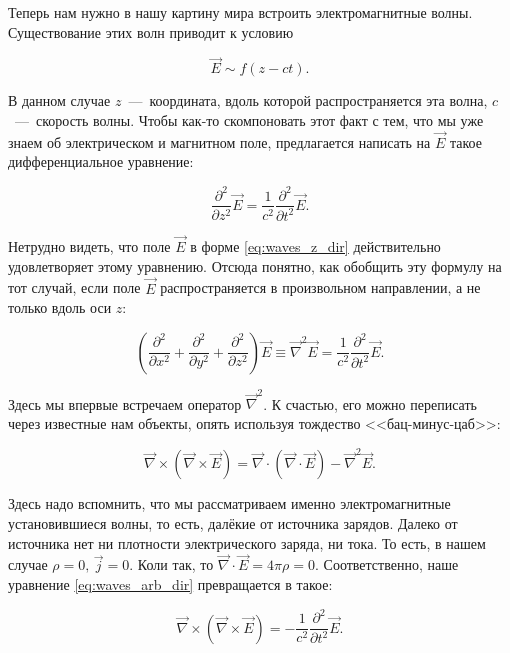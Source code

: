 \documentclass[a4paper,12pt]{article}
\newcommand{\pt}{\partial}
\newcommand{\vn}{\vec{\nabla}}
\begin{document}
Теперь нам нужно в нашу картину мира встроить электромагнитные
волны. Существование этих волн приводит к условию

\begin{equation}
  \label{eq:waves_z_dir}
  \vec{E} \sim f (z-ct).
\end{equation}

В данном случае $z$~---~координата, вдоль которой распространяется эта
волна, $c$~---~скорость волны. Чтобы как-то скомпоновать этот факт с
тем, что мы уже знаем об электрическом и магнитном поле, предлагается
написать на $\vec{E}$ такое дифференциальное уравнение: 

\begin{equation}
  \label{eq:waves_diff_eq}
  \frac{\pt^2}{\pt z^2} \vec{E} = \frac{1}{c^2} \frac{\pt^2}{\pt t^2} \vec{E}.
\end{equation}

Нетрудно видеть, что поле $\vec{E}$ в форме \eqref{eq:waves_z_dir}
действительно удовлетворяет этому уравнению. Отсюда понятно, как
обобщить эту формулу на тот случай, если поле $\vec{E}$
распространяется в произвольном направлении, а не только вдоль оси
$z$: 

\begin{equation}
  \label{eq:waves_arb_dir}
   \left( \frac{\pt^2}{\pt x^2} + \frac{\pt^2}{\pt y^2} + \frac{\pt^2}{\pt
     z^2} \right) \vec{E} \equiv \vn^2 \vec{E} = \frac{1}{c^2} \frac{\pt^2}{\pt t^2} \vec{E}.
\end{equation}

Здесь мы впервые встречаем оператор $\vn^2$. К счастью, его можно
переписать через известные нам объекты, опять используя тождество
<<бац-минус-цаб>>: 

\begin{equation}
  \label{eq:bac_cab_2}
  \vn \times \left( \vn \times \vec{E}  \right) = \vn \cdot \left( \vn
  \cdot \vec{E} \right) - \vn^2 \vec{E}.
\end{equation}

Здесь надо вспомнить, что мы рассматриваем именно электромагнитные
установившиеся волны, то есть, далёкие от источника зарядов. Далеко от
источника нет ни плотности электрического заряда, ни тока. То есть, в
нашем случае $\rho=0, \, \vec{j}=0$. Коли так, то $\vn \cdot \vec{E}
= 4 \pi \rho=0$. Соответственно, наше уравнение
\eqref{eq:waves_arb_dir} превращается в такое: 

\begin{equation}
  \label{eq:waves_eq_2}
  \vn \times \left( \vn \times \vec{E}  \right) = - \frac{1}{c^2} \frac{\pt^2}{\pt t^2} \vec{E}.
\end{equation}
\end{document}
